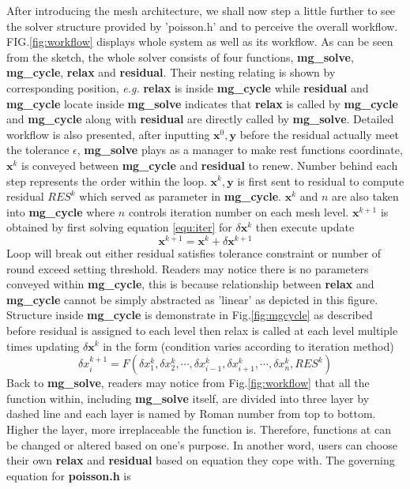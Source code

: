 \documentclass[a4paper]{article}
\newcommand{\func}[1]{\textbf{\textcolor{function}{#1}}}
\begin{document}
After introducing the mesh architecture, we shall now step a little further to see the solver structure provided by 'poisson.h' and to perceive the overall workflow. FIG.\ref{fig:workflow} displays whole system as well as its workflow. As can be seen from the sketch, the whole solver consists of four functions, \func{mg\_solve}, \func{mg\_cycle}, \func{relax} and \func{residual}. Their nesting relating is shown by corresponding position, \emph{e.g.} \func{relax} is inside \func{mg\_cycle} while \func{residual} and \func{mg\_cycle} locate inside \func{mg\_solve} indicates that \func{relax} is called by \func{mg\_cycle} and \func{mg\_cycle} along with \func{residual} are directly called by \func{mg\_solve}. Detailed workflow is also presented, after inputting $ \mathbf{x}^0, \mathbf{y}$ before the residual actually meet the tolerance $\epsilon$, \func{mg\_solve} plays as a manager to make rest functions coordinate, $ \mathbf{x}^k$ is conveyed between \func{mg\_cycle} and \func{residual} to renew. Number behind each step represents the order within the loop. $ \mathbf{x}^k, \mathbf{y}$ is first sent to residual to compute residual $RES^k$ which served as parameter in \func{mg\_cycle}. $ \mathbf{x}^k$ and $n$ are also taken into \func{mg\_cycle} where $n$ controls iteration number on each mesh level. $ \mathbf{x}^{k+1}$ is obtained by first solving equation \ref{equ:iter} for $\delta \mathbf{x}^k$ then execute update
\begin{equation}
  \mathbf{x}^{k+1} = \mathbf{x}^k + \delta \mathbf{x}^{k+1}
\end{equation}
Loop will break out either residual satisfies tolerance constraint or number of round exceed setting threshold. Readers may notice there is no parameters conveyed within \func{mg\_cycle}, this is because relationship between \func{relax} and \func{mg\_cycle} cannot be simply abstracted as 'linear' as depicted in this figure. Structure inside \func{mg\_cycle} is demonstrate in Fig.\ref{fig:mgcycle} as described before residual is assigned to each level then relax is called at each level multiple times updating $\delta \mathbf{x}^k$ in the form (condition varies according to iteration method)
\begin{equation}\label{equ:indirect}
  \delta x^{k+1}_i = F(\delta x^k_1,\delta x^k_2,\cdots,\delta x^k_{i-1},\delta x^k_{i+1},\cdots,\delta x_n^k, RES^k)
\end{equation}
Back to \func{mg\_solve}, readers may notice from Fig.\ref{fig:workflow} that all the function within, including \func{mg\_solve} itself, are divided into three layer by dashed line and each layer is named by Roman number from top to bottom. Higher the layer, more irreplaceable the function is. Therefore, functions at  can be changed or altered based on one's purpose. In another word, users can choose their own \func{relax} and \func{residual} based on equation they cope with. The governing equation for \textbf{poisson.h} is
\end{document}
